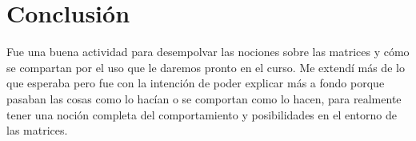\documentclass{article}
\begin{document}
\section{Conclusión}
Fue una buena actividad para desempolvar las nociones sobre las matrices y cómo se compartan
por el uso que le daremos pronto en el curso. Me extendí más de lo que esperaba pero fue con
la intención de poder explicar más a fondo porque pasaban las cosas como lo hacían o se
comportan como lo hacen, para realmente tener una noción completa del comportamiento y
posibilidades en el entorno de las matrices.
\end{document}
